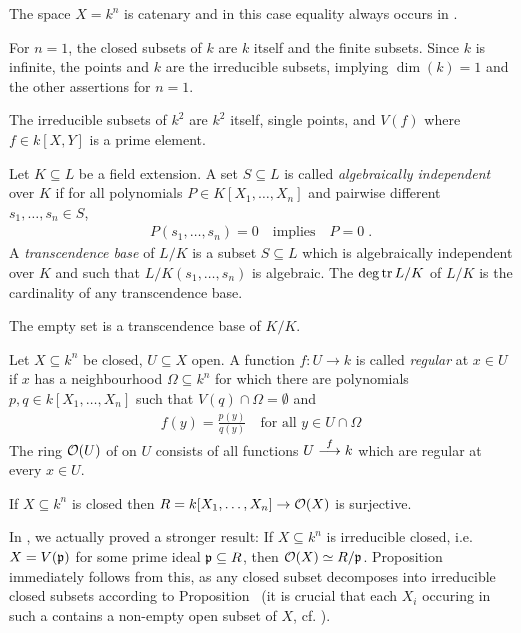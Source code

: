 \documentclass[a4paper,parskip=full,numbers=enddot]{scrreprt}
\begin{document}
\setcounter{thm}{4}
\begin{thm}
 The space $X=k^n$ is catenary and in this case equality always occurs in .
\end{thm}
\begin{example}
 For $n=1$, the closed subsets of $k$ are $k$ itself and the finite subsets. Since $k$ is infinite, the points and $k$ are the irreducible subsets, implying $\dim(k) = 1 $ and the other assertions for $n=1$.
\end{example}
\begin{example}
 The irreducible subsets of $k^2$ are $k^2$ itself, single points, and $V(f)$ where $f\in k[X,Y]$ is a prime element.
\end{example}
\begin{defi}
    Let $K\subseteq L$ be a field extension. A set $S\subseteq L$ is called \emph{algebraically independent} over $K$ if for all polynomials $P\in K[X_1,\ldots,X_n]$ and pairwise different $s_1,\ldots, s_n\in S$, 
    \begin{align*}
    	P(s_1,\ldots, s_n) =0\quad\text{implies}\quad P=0\;. 
    \end{align*}
    A \emph{transcendence base} of $L/K$ is a subset $S\subseteq L$ which is algebraically independent over $K$ and such that $L/K(s_1,\ldots,s_n)$ is algebraic. The  $\deg\tr L/K$ of $L/K$ is the cardinality of any transcendence base.
\end{defi}
\begin{example*}
 The empty set is a transcendence base of $K/K$. 
 \end{example*}
\begin{defi} 
    Let $X\subseteq k^n$ be closed, $U\subseteq X$ open. A function $f\colon U\to k$ is called \emph{regular} at $x\in U$ if $x$ has a neighbourhood $\Omega\subseteq k^n$ for which there are polynomials $p,q\in k[X_1,\ldots,X_n]$ such that $V(q)\cap \Omega=\emptyset$ and 
    \begin{align*}
    	f(y) = \frac{p(y)}{q(y)}\quad\text{for all }y\in U\cap \Omega
    \end{align*}
    The ring $\Oo(U)$ of  on $U$ consists of all functions $U\morphism[f] k$ which are regular at every $x\in U$.
\end{defi}
\begin{prop}
	If $X\subseteq k^n$ is closed then $R= k[X_1,\ldots, X_n] \to \Oo(X)$ is surjective.
\end{prop}
In \cite[Proposition~2.2.2]{alg1}, we actually proved a stronger result: If $X\subseteq k^n$ is irreducible closed, i.e. $X=V(\pp)$ for some prime ideal $\pp\subseteq R$, then $\Oo(X)\simeq R/\pp$. Proposition~ immediately follows from this, as any closed subset decomposes into irreducible closed subsets according to Proposition~ (it is crucial that each $X_i$ occuring in such a contains a non-empty open subset of $X$, cf. \cite[Proposition~2.1.1]{alg1}).
\end{document}
